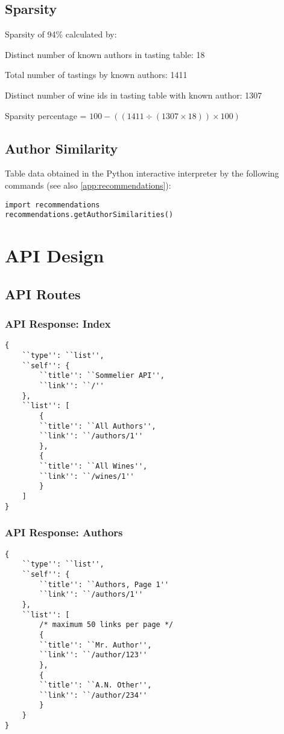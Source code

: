 \subsection{Sparsity} \label{app:datasparsity}

Sparsity of 94\% calculated by:

Distinct number of known authors in tasting table: 18

Total number of tastings by known authors: 1411

Distinct number of wine ids in tasting table with known author: 1307

Sparsity percentage = $100 - (( 1411 \div ( 1307 \times 18 )) \times 100) $

\subsection{Author Similarity} \label{app:authorsim}

Table data obtained in the Python interactive interpreter by the following commands (see also \ref{app:recommendations}):

\begin{verbatim}
import recommendations
recommendations.getAuthorSimilarities()
\end{verbatim}

\section{API Design}

\subsection{API Routes}

\subsubsection{API Response: Index}\label{app:apiindex}
\begin{verbatim}
{
    ``type'': ``list'',
    ``self'': {
        ``title'': ``Sommelier API'',
        ``link'': ``/''
    },
    ``list'': [
        {
        ``title'': ``All Authors'',
        ``link'': ``/authors/1''
        },
        {
        ``title'': ``All Wines'',
        ``link'': ``/wines/1''
        }
    ]
}
\end{verbatim}

\subsubsection{API Response: Authors}\label{app:apiauthors}
\begin{verbatim}
{
    ``type'': ``list'',
    ``self'': {
        ``title'': ``Authors, Page 1''
        ``link'': ``/authors/1''
    },
    ``list'': [
        /* maximum 50 links per page */
        {
        ``title'': ``Mr. Author'',
        ``link'': ``/author/123''
        },
        {
        ``title'': ``A.N. Other'',
        ``link'': ``/author/234''
        }
    }
}
\end{verbatim}
    
